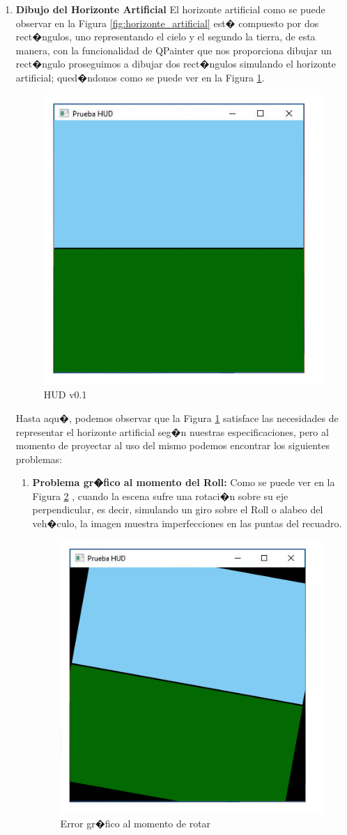 \begin{enumerate}
	
	\item \textbf{Dibujo del Horizonte Artificial}
	El horizonte artificial como se puede observar en la Figura \ref{fig:horizonte_artificial} est� compuesto por dos rect�ngulos, uno representando el cielo y el segundo la tierra, de esta manera, con la funcionalidad de QPainter que nos proporciona dibujar un rect�ngulo proseguimos a dibujar dos rect�ngulos simulando el horizonte artificial; qued�ndonos como se puede ver en la Figura \ref{fig:hudv0}.
	\begin{figure}[h!]
		\centering
		\includegraphics[width=0.3\linewidth, height=0.3\linewidth]{Imagenes/HUD_v0}
		\caption{HUD v0.1}
		\label{fig:hudv0}
	\end{figure}
	
	\par Hasta aqu�, podemos observar que la Figura \ref{fig:hudv0} satisface las necesidades de representar el horizonte artificial seg�n nuestras especificaciones, pero al momento de proyectar al uso del mismo podemos encontrar los siguientes problemas:
	
	\begin{enumerate}
		
		\item \textbf{Problema gr�fico al momento del Roll: } Como se puede ver en la Figura \ref{fig:hudv0e1} , cuando la escena sufre una rotaci�n sobre su eje perpendicular, es decir, simulando un giro sobre el Roll o alabeo del veh�culo, la imagen muestra imperfecciones en las puntas del recuadro. 
		
		\begin{figure}[h]
			\centering
			\includegraphics[width=0.3\linewidth, height=0.3\linewidth]{Imagenes/HUD_v0_e1}
			\caption{Error gr�fico al momento de rotar}
			\label{fig:hudv0e1}
		\end{figure}
		

\end{enumerate}
\end{enumerate}
